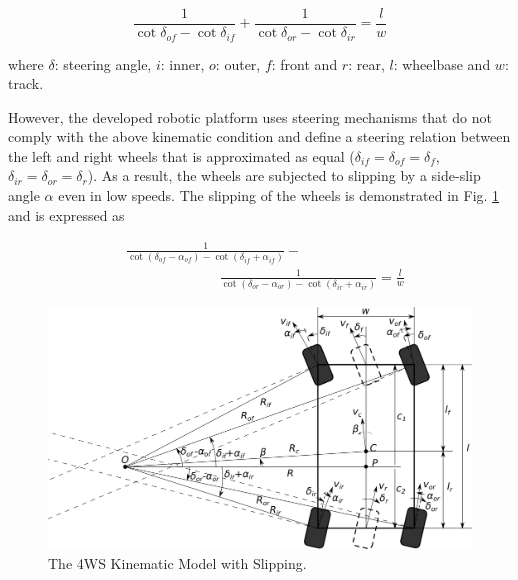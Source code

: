 \documentclass[conference]{IEEEtran}
\begin{document}
\begin{equation}
	\frac{1}{\cot{\delta_{of}} - \cot{\delta_{if}}} + \frac{1}{\cot{\delta_{or}} - \cot{\delta_{ir}}} = \frac{l}{w}
	\label{eq:4ws_condition}
\end{equation}

\noindent
where $\delta$: steering angle, $i$: inner, $o$: outer, $f$: front and $r$: rear, $l$: wheelbase and $w$: track.
%

However, the developed robotic platform uses steering mechanisms that do not comply with the above kinematic condition and define a steering relation between the left and right wheels that is approximated as equal ($\delta_{if}=\delta_{of}=\delta_f$, $\delta_{ir}=\delta_{or}=\delta_r$). As a result, the wheels are subjected to slipping by a side-slip angle $\alpha$ even in low speeds. The slipping of the wheels is demonstrated in Fig. \ref{fig:4ws_slip_model} and is expressed as

\begin{equation}
	\begin{split}
	&\frac{1}{\cot(\delta_{of} - \alpha_{of}) - \cot(\delta_{if} + \alpha_{if})} -\\ &\;\;\;\;\;\;\;\;\;\;\;\;\;\;\;\;\;\;\;\;\;\;\;\;\frac{1}{\cot(\delta_{or} - \alpha_{or}) - \cot(\delta_{ir} + \alpha_{ir})} = \frac{l}{w}
	\end{split}
	\label{eq:monst_kinematic_condition}
\end{equation}
	
\begin{figure}[!ht]
	\centering
	\includegraphics[width=\linewidth]{Figures/monst_slip_model.png}%
	\caption{The 4WS Kinematic Model with Slipping.}
	\label{fig:4ws_slip_model}
\end{figure}
\end{document}
